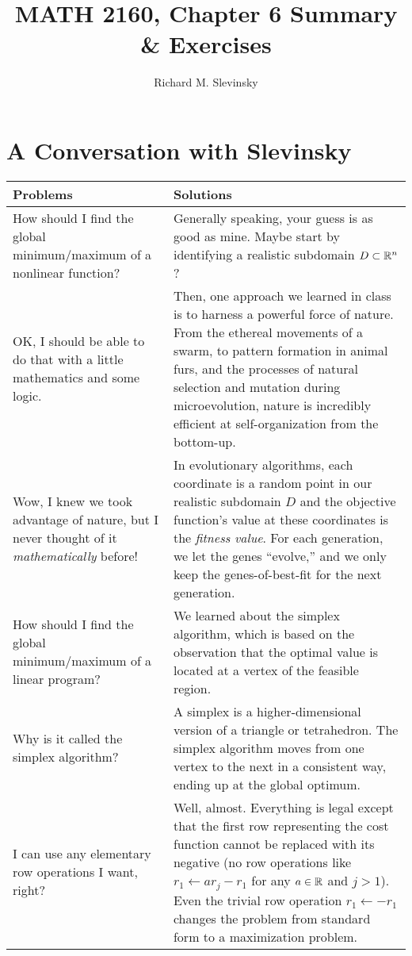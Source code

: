 \documentclass[11pt,letterpaper]{article}
\begin{document}
\title{MATH 2160, Chapter 6 Summary \& Exercises}
\author{Richard M. Slevinsky}
\date{}
\maketitle

\section*{A Conversation with Slevinsky}

\begin{longtable}{p{}|p{}}
\hline
Problems & Solutions\\
\hline
How should I find the global minimum/maximum of a nonlinear function? & Generally speaking, your guess is as good as mine. Maybe start by identifying a realistic subdomain $D\subset\mathbb{R}^n$?\\
OK, I should be able to do that with a little mathematics and some logic. & Then, one approach we learned in class is to harness a powerful force of nature. From the ethereal movements of a swarm, to pattern formation in animal furs, and the processes of natural selection and mutation during microevolution, nature is incredibly efficient at self-organization from the bottom-up.\\
Wow, I knew we took advantage of nature, but I never thought of it {\em mathematically} before! & In evolutionary algorithms, each coordinate is a random point in our realistic subdomain $D$ and the objective function's value at these coordinates is the {\em fitness value}. For each generation, we let the genes ``evolve,'' and we only keep the genes-of-best-fit for the next generation.\\
\hline
How should I find the global minimum/maximum of a linear program? & We learned about the simplex algorithm, which is based on the observation that the optimal value is located at a vertex of the feasible region.\\
Why is it called the simplex algorithm? & A simplex is a higher-dimensional version of a triangle or tetrahedron. The simplex algorithm moves from one vertex to the next in a consistent way, ending up at the global optimum.\\
I can use any elementary row operations I want, right? & Well, almost. Everything is legal except that the first row representing the cost function cannot be replaced with its negative (no row operations like $r_1\leftarrow ar_j - r_1$ for any $a\in\mathbb{R}$ and $j>1$). Even the trivial row operation $r_1\leftarrow -r_1$ changes the problem from standard form to a maximization problem.\\
\hline
\end{longtable}
\end{document}
